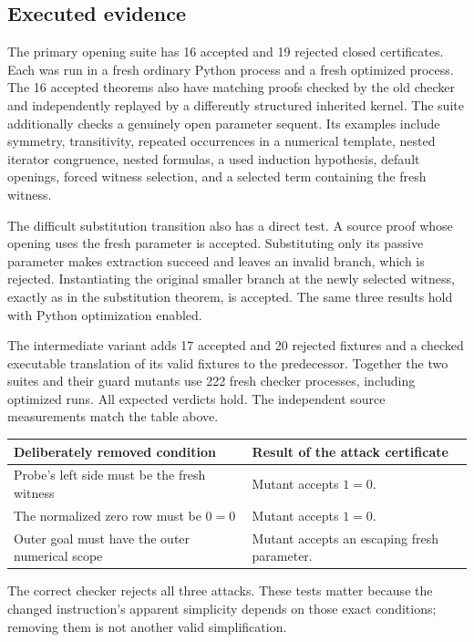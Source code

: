 \documentclass[11pt,letterpaper]{article}
\theoremstyle{definition}
\begin{document}
\subsection{Executed evidence}

The primary opening suite has 16 accepted and 19 rejected closed
certificates.  Each was run in a fresh ordinary Python process and a fresh
optimized process.  The 16 accepted theorems also have matching proofs
checked by the old checker and independently replayed by a differently
structured inherited kernel.  The suite additionally checks a genuinely
open parameter sequent.  Its examples include symmetry, transitivity,
repeated occurrences in a numerical template, nested iterator congruence,
nested formulas, a used induction hypothesis, default openings, forced
witness selection, and a selected term containing the fresh witness.

The difficult substitution transition also has a direct test. A source
proof whose opening uses the fresh parameter is accepted. Substituting
only its passive parameter makes extraction succeed and leaves an invalid
branch, which is rejected. Instantiating the original smaller branch at
the newly selected witness, exactly as in the substitution theorem, is
accepted. The same three results hold with Python optimization enabled.

The intermediate variant adds 17 accepted and 20 rejected fixtures and a
checked executable translation of its valid fixtures to the predecessor.
Together the two suites and their guard mutants use 222 fresh checker
processes, including optimized runs.  All expected verdicts hold.
The independent source measurements match the table above.

\begin{center}
\begin{tabular}{p{.35\linewidth}p{.53\linewidth}}
\toprule
Deliberately removed condition & Result of the attack certificate\\
\midrule
Probe's left side must be the fresh witness & Mutant accepts $1=0$.\\
The normalized zero row must be $0=0$ & Mutant accepts $1=0$.\\
Outer goal must have the outer numerical scope & Mutant accepts an escaping fresh parameter.\\
\bottomrule
\end{tabular}
\end{center}

The correct checker rejects all three attacks.  These tests matter because
the changed instruction's apparent simplicity depends on those exact
conditions; removing them is not another valid simplification.
\end{document}
